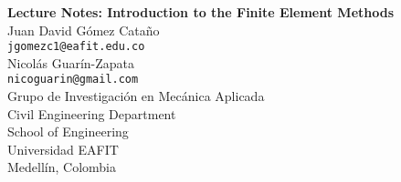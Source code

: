 %
\begin{center}
\vspace{70mm}
\Large{\textbf{Lecture Notes: Introduction to the Finite Element Methods}}
\large
\\[60mm]
Juan David Gómez Cata\~no\\
\texttt{jgomezc1@eafit.edu.co}\\
Nicolás Guarín-Zapata\\
\texttt{nicoguarin@gmail.com}
\\[40mm]
Grupo de Investigación en Mecánica Aplicada
\\
Civil Engineering Department
\\
School of Engineering
\\
Universidad EAFIT
\\
Medellín, Colombia
\\
\the\year
\end{center}
\thispagestyle{empty}